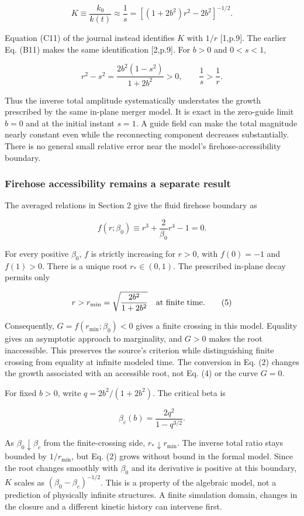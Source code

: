 \[
K\equiv\frac{k_0}{k(t)}\approx\frac{1}{s}
=\left[(1+2b^2)r^2-2b^2\right]^{-1/2}. \tag{2}
\]

Equation (C11) of the journal instead identifies \(K\) with \(1/r\)
{[}1,p.9{]}. The earlier Eq. (B11) makes the same identification
{[}2,p.9{]}. For \(b>0\) and \(0<s<1\),

\[
r^2-s^2=\frac{2b^2(1-s^2)}{1+2b^2}>0,
\qquad \frac1s>\frac1r. \tag{3}
\]

Thus the inverse total amplitude systematically understates the growth
prescribed by the same in-plane merger model. It is exact in the
zero-guide limit \(b=0\) and at the initial instant \(s=1\). A guide
field can make the total magnitude nearly constant even while the
reconnecting component decreases substantially. There is no general
small relative error near the model's firehose-accessibility boundary.

\subsubsection{Firehose accessibility remains a separate
result}\label{firehose-accessibility-remains-a-separate-result}

The averaged relations in Section 2 give the fluid firehose boundary as

\[
f(r;\beta_0)\equiv r^3+\frac{2}{\beta_0}r^4-1=0. \tag{4}
\]

For every positive \(\beta_0\), \(f\) is strictly increasing for
\(r>0\), with \(f(0)=-1\) and \(f(1)>0\). There is a unique root
\(r_*\in(0,1)\). The prescribed in-plane decay permits only

\[
r>r_{\min}=\sqrt{\frac{2b^2}{1+2b^2}}
\quad\hbox{at finite time}. \tag{5}
\]

Consequently, \(G=f(r_{\min};\beta_0)<0\) gives a finite crossing in
this model. Equality gives an asymptotic approach to marginality, and
\(G>0\) makes the root inaccessible. This preserves the source's
criterion while distinguishing finite crossing from equality at infinite
modeled time. The conversion in Eq. (2) changes the growth associated
with an accessible root, not Eq. (4) or the curve \(G=0\).

For fixed \(b>0\), write \(q=2b^2/(1+2b^2)\). The critical beta is

\[
\beta_c(b)=\frac{2q^2}{1-q^{3/2}}. \tag{6}
\]

As \(\beta_0\downarrow\beta_c\) from the finite-crossing side,
\(r_*\downarrow r_{\min}\). The inverse total ratio stays bounded by
\(1/r_{\min}\), but Eq. (2) grows without bound in the formal model.
Since the root changes smoothly with \(\beta_0\) and its derivative is
positive at this boundary, \(K\) scales as \((\beta_0-\beta_c)^{-1/2}\).
This is a property of the algebraic model, not a prediction of
physically infinite structures. A finite simulation domain, changes in
the closure and a different kinetic history can intervene first.

